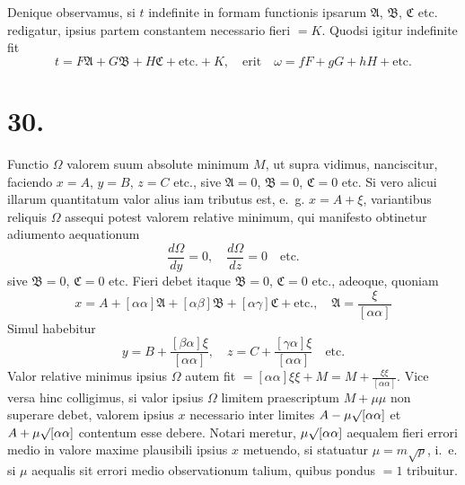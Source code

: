 \documentclass[12pt,a4paper]{book}
\begin{document}
Denique observamus, si $t$ indefinite in formam functionis ipsarum $\mathfrak{A}$, $\mathfrak{B}$, $\mathfrak{C}$ etc. redigatur, ipsius partem constantem necessario fieri $=K$. Quodsi igitur indefinite fit
%
\begin{equation*}
t=F\mathfrak{A}+G\mathfrak{B}+H\mathfrak{C}+\text{etc.}+K,\quad\text{erit}\quad\omega=fF+gG+hH+\text{etc.}
\end{equation*}

\section*{30.}
\label{sec:art30}

Functio $\Omega$ valorem suum absolute minimum $M$, ut supra vidimus, nanciscitur, faciendo $x=A$, $y=B$, $z=C$ etc., sive $\mathfrak{A}=0$, $\mathfrak{B}=0$, $\mathfrak{C}=0$ etc. Si vero alicui illarum quantitatum valor alius iam tributus est, e.~g. $x=A+\xi$, variantibus reliquis $\Omega$ assequi potest valorem relative minimum, qui manifesto obtinetur adiumento aequationum
%
\begin{equation*}
\frac{d\Omega}{dy}=0,\quad\frac{d\Omega}{dz}=0\quad\text{etc.}
\end{equation*}
sive $\mathfrak{B}=0$, $\mathfrak{C}=0$ etc. Fieri debet itaque $\mathfrak{B}=0$, $\mathfrak{C}=0$ etc., adeoque, quoniam
%
\begin{equation*}
x=A+[\alpha\alpha]\mathfrak{A}+[\alpha\beta]\mathfrak{B}+[\alpha\gamma]\mathfrak{C}+\text{etc.},\quad\mathfrak{A}=\frac{\xi}{[\alpha\alpha]}
\end{equation*}
Simul habebitur
%
\begin{equation*}
y=B+\frac{[\beta\alpha]\xi}{[\alpha\alpha]},\quad z=C+\frac{[\gamma\alpha]\xi}{[\alpha\alpha]}\quad\text{etc.}
\end{equation*}
Valor relative minimus ipsius $\Omega$ autem fit $=[\alpha\alpha]\xi\xi+M=M+\frac{\xi\xi}{[\alpha\alpha]}$. Vice versa hinc colligimus, si valor ipsius $\Omega$ limitem praescriptum $M+\mu\mu$ non superare debet, valorem ipsius $x$ necessario inter limites $A-\mu\surd[\alpha\alpha]$ et $A+\mu\surd[\alpha\alpha]$ contentum esse debere. Notari meretur, $\mu\surd[\alpha\alpha]$ aequalem fieri errori medio in valore maxime plausibili ipsius $x$ metuendo, si statuatur $\mu=m\surd p$, i.~e. si $\mu$ aequalis sit errori medio observationum talium, quibus pondus $=1$ tribuitur.
\end{document}
